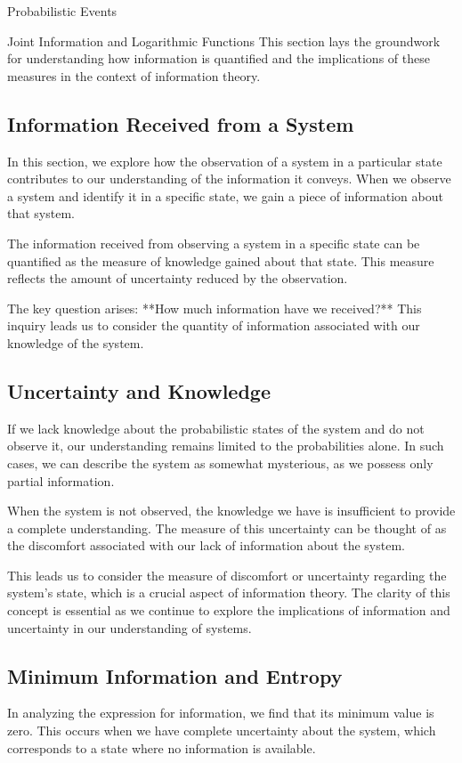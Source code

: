 \documentclass[12pt,a4paper]{article}
\newenvironment{defbox}[1][]{%
  \begin{tcolorbox}[enhanced, breakable, colback=defcolor, colframe=green!50!black, title=#1, fonttitle=\bfseries, arc=3pt, boxrule=0.5pt]
}{\end{tcolorbox}}
\newenvironment{rembox}[1][]{%
  \begin{tcolorbox}[enhanced, breakable, colback=gray!5, colframe=gray!50, title=#1, fonttitle=\bfseries, arc=3pt, boxrule=0.5pt]
}{\end{tcolorbox}}
\begin{document}
\begin{section}{Probabilistic Events}
\begin{section}{Joint Information and Logarithmic Functions}
This section lays the groundwork for understanding how information is quantified and the implications of these measures in the context of information theory.

\subsection{Information Received from a System}
In this section, we explore how the observation of a system in a particular state contributes to our understanding of the information it conveys. When we observe a system and identify it in a specific state, we gain a piece of information about that system.

\begin{defbox}[Information Received]
The information received from observing a system in a specific state can be quantified as the measure of knowledge gained about that state. This measure reflects the amount of uncertainty reduced by the observation.
\end{defbox}

The key question arises: **How much information have we received?** This inquiry leads us to consider the quantity of information associated with our knowledge of the system.

\subsection{Uncertainty and Knowledge}
If we lack knowledge about the probabilistic states of the system and do not observe it, our understanding remains limited to the probabilities alone. In such cases, we can describe the system as somewhat mysterious, as we possess only partial information.

\begin{rembox}[Uncertainty in Knowledge]
When the system is not observed, the knowledge we have is insufficient to provide a complete understanding. The measure of this uncertainty can be thought of as the discomfort associated with our lack of information about the system.
\end{rembox}

This leads us to consider the measure of discomfort or uncertainty regarding the system's state, which is a crucial aspect of information theory. The clarity of this concept is essential as we continue to explore the implications of information and uncertainty in our understanding of systems.

\subsection{Minimum Information and Entropy}
In analyzing the expression for information, we find that its minimum value is zero. This occurs when we have complete uncertainty about the system, which corresponds to a state where no information is available. 


\end{section}
\end{section}
\end{document}
